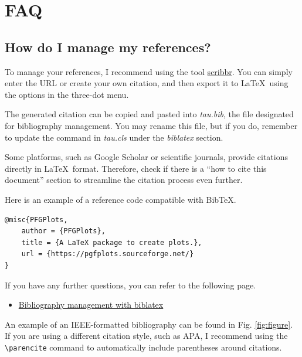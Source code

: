 \documentclass[9pt,a4paper,twocolumn,twoside]{tau-class/tau}
\begin{document}
\section{FAQ}

    \subsection*{How do I manage my references?}
        
        To manage your references, I recommend using the tool \href{https://www.scribbr.es/citar/generador/folders/73QOXYsCwMRu4ifQaN65mx/lists/msTfx7GJjIAOUkufbISnA/}{scribbr}. You can simply enter the URL or create your own citation, and then export it to \LaTeX\ using the options in the three-dot menu.
            
        The generated citation can be copied and pasted into \textit{tau.bib}, the file designated for bibliography management. You may rename this file, but if you do, remember to update the \verb|| command in \textit{tau.cls} under the \textit{biblatex} section.
    
        \begin{note}
            Some platforms, such as Google Scholar or scientific journals, provide citations directly in \LaTeX\ format. Therefore, check if there is a ``how to cite this document'' section to streamline the citation process even further.
        \end{note}
    
        Here is an example of a reference code compatible with Bib\TeX.

\begin{verbatim}
@misc{PFGPlots,
    author = {PFGPlots},
    title = {A LaTeX package to create plots.},
    url = {https://pgfplots.sourceforge.net/}
}
\end{verbatim}

        If you have any further questions, you can refer to the following page.

        \begin{itemize}
            \item \href{https://es.overleaf.com/learn/latex/Bibliography_management_with_biblatex}{Bibliography management with biblatex}
        \end{itemize}
            
        An example of an IEEE-formatted bibliography can be found in Fig. \ref{fig:figure}. If you are using a different citation style, such as APA, I recommend using the \verb|\parencite| command to automatically include parentheses around citations.
\end{document}

